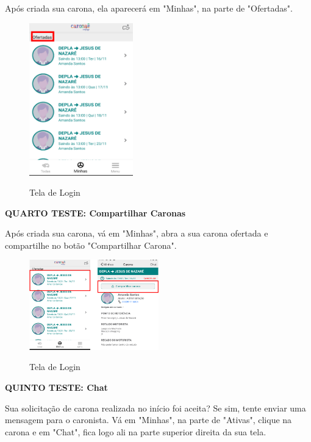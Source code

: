 Após criada sua carona, ela aparecerá em "Minhas", na parte de "Ofertadas".

\begin{figure}[H]
	\centering
	\caption{Tela de Login}
	\includegraphics[width=0.4\textwidth]{./04-figuras/manual/criacao_de_carona_2.png}
	\label{fig:criacao_de_carona_2}
\end{figure}

\textbf{QUARTO TESTE: Compartilhar Caronas}

Após criada sua carona, vá em "Minhas", abra a sua carona ofertada e compartilhe no
botão "Compartilhar Carona".

\begin{figure}[H]
	\centering
	\caption{Tela de Login}
	\includegraphics[width=0.5\textwidth]{./04-figuras/manual/compartilhamento_de_carona.png}
	\label{fig:compartilhamento_de_carona}
\end{figure}

\textbf{QUINTO TESTE: Chat}

Sua solicitação de carona realizada no início foi aceita? Se sim, tente enviar uma mensagem para o caronista.
Vá em "Minhas", na parte de "Ativas", clique na carona e em "Chat", fica logo ali na parte superior direita da sua tela.

